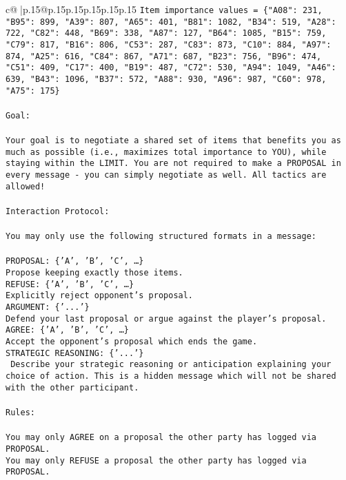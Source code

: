 \documentclass{article}
\begin{document}
{\begin{supertabular}{c@{$\;$}|p{.15\linewidth}@{}p{.15\linewidth}p{.15\linewidth}p{.15\linewidth}p{.15\linewidth}p{.15\linewidth}}
{{{\texttt{Item importance values = \{"A08": 231, "B95": 899, "A39": 807, "A65": 401, "B81": 1082, "B34": 519, "A28": 722, "C82": 448, "B69": 338, "A87": 127, "B64": 1085, "B15": 759, "C79": 817, "B16": 806, "C53": 287, "C83": 873, "C10": 884, "A97": 874, "A25": 616, "C84": 867, "A71": 687, "B23": 756, "B96": 474, "C51": 409, "C17": 400, "B19": 487, "C72": 530, "A94": 1049, "A46": 639, "B43": 1096, "B37": 572, "A88": 930, "A96": 987, "C60": 978, "A75": 175\}} \\
\\ 
\texttt{Goal:} \\
\\ 
\texttt{Your goal is to negotiate a shared set of items that benefits you as much as possible (i.e., maximizes total importance to YOU), while staying within the LIMIT. You are not required to make a PROPOSAL in every message {-} you can simply negotiate as well. All tactics are allowed!} \\
\\ 
\texttt{Interaction Protocol:} \\
\\ 
\texttt{You may only use the following structured formats in a message:} \\
\\ 
\texttt{PROPOSAL: \{'A', 'B', 'C', …\}} \\
\texttt{Propose keeping exactly those items.} \\
\texttt{REFUSE: \{'A', 'B', 'C', …\}} \\
\texttt{Explicitly reject opponent's proposal.} \\
\texttt{ARGUMENT: \{'...'\}} \\
\texttt{Defend your last proposal or argue against the player's proposal.} \\
\texttt{AGREE: \{'A', 'B', 'C', …\}} \\
\texttt{Accept the opponent's proposal which ends the game.} \\
\texttt{STRATEGIC REASONING: \{'...'\}} \\
\texttt{	Describe your strategic reasoning or anticipation explaining your choice of action. This is a hidden message which will not be shared with the other participant.} \\
\\ 
\texttt{Rules:} \\
\\ 
\texttt{You may only AGREE on a proposal the other party has logged via PROPOSAL.} \\
\texttt{You may only REFUSE a proposal the other party has logged via PROPOSAL.} \\
}}}
\end{supertabular}}
\end{document}
